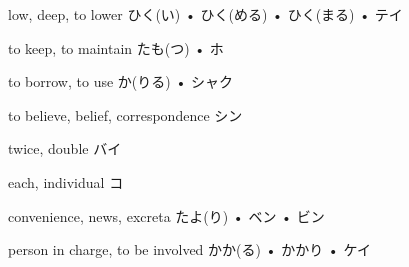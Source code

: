 



\setcounter{cardnum}{17}

		{low, deep, to lower}
		{ひく(い) • ひく(める) • ひく(まる) • テイ}
		{}{}
		{}{}
		{}{}
		{}{}
		{}{}

		{to keep, to maintain}
		{たも(つ) • ホ}
		{}{}
		{}{}
		{}{}
		{}{}
		{}{}

		{to borrow, to use}
		{か(りる) • シャク}
		{}{}
		{}{}
		{}{}
		{}{}
		{}{}

		{to believe, belief, correspondence}
		{シン}
		{}{}
		{}{}
		{}{}
		{}{}
		{}{}

		{twice, double}
		{バイ}
		{}{}
		{}{}
		{}{}
		{}{}
		{}{}

		{each, individual}
		{コ}
		{}{}
		{}{}
		{}{}
		{}{}
		{}{}

		{convenience, news, excreta}
		{たよ(り) • ベン • ビン}
		{}{}
		{}{}
		{}{}
		{}{}
		{}{}

		{person in charge, to be involved}
		{かか(る) • かかり • ケイ}
		{}{}
		{}{}
		{}{}
		{}{}
		{}{}

